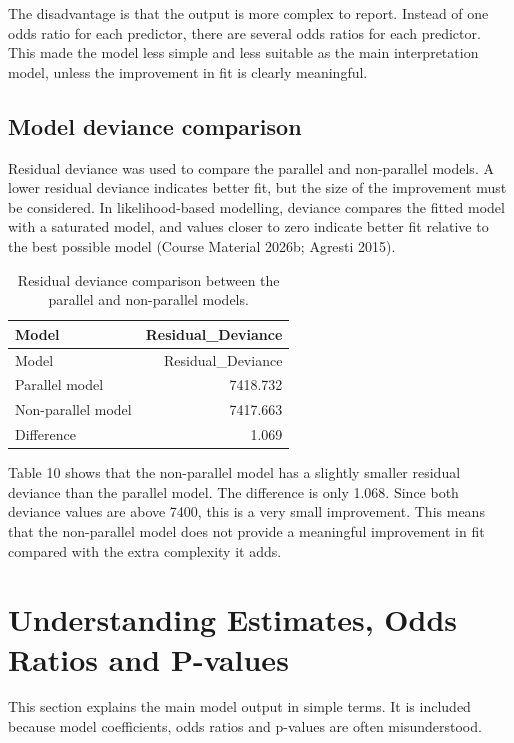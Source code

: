 \documentclass{article}
\begin{document}
The disadvantage is that the output is more complex to report. Instead
of one odds ratio for each predictor, there are several odds ratios for
each predictor. This made the model less simple and less suitable as the
main interpretation model, unless the improvement in fit is clearly
meaningful.

\subsection{Model deviance comparison}\label{model-deviance-comparison}

Residual deviance was used to compare the parallel and non-parallel
models. A lower residual deviance indicates better fit, but the size of
the improvement must be considered. In likelihood-based modelling,
deviance compares the fitted model with a saturated model, and values
closer to zero indicate better fit relative to the best possible model
(Course Material 2026b; Agresti 2015).

\begin{longtable}[]{@{}lr@{}}
\caption{Residual deviance comparison between the parallel and
non-parallel models.}\tabularnewline
\toprule\noalign{}
Model & Residual\_Deviance \\
\midrule\noalign{}
\endfirsthead
\toprule\noalign{}
Model & Residual\_Deviance \\
\midrule\noalign{}
\endhead
\bottomrule\noalign{}
\endlastfoot
Parallel model & 7418.732 \\
Non-parallel model & 7417.663 \\
Difference & 1.069 \\
\end{longtable}

Table 10 shows that the non-parallel model has a slightly smaller
residual deviance than the parallel model. The difference is only 1.068.
Since both deviance values are above 7400, this is a very small
improvement. This means that the non-parallel model does not provide a
meaningful improvement in fit compared with the extra complexity it
adds.

\section{Understanding Estimates, Odds Ratios and
P-values}\label{understanding-estimates-odds-ratios-and-p-values}

This section explains the main model output in simple terms. It is
included because model coefficients, odds ratios and p-values are often
misunderstood.
\end{document}
